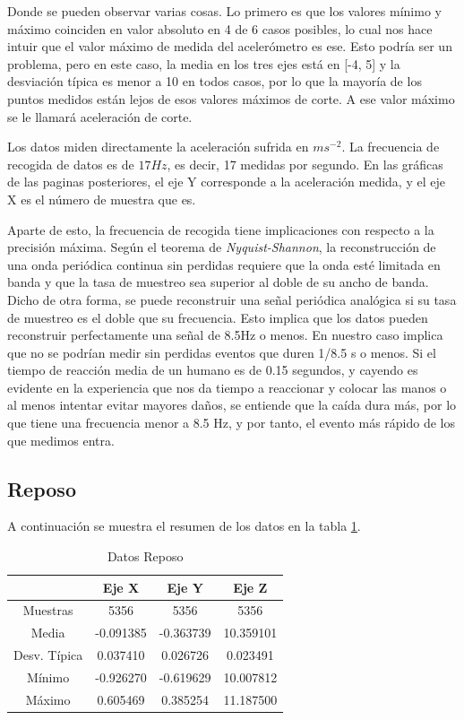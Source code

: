 \documentclass[12pt]{book}
\numberwithin{equation}{section}
\begin{document}
Donde se pueden observar varias cosas. Lo primero es que los valores mínimo y máximo coinciden en valor absoluto en 4 de 6 casos posibles, lo cual nos hace intuir que el valor máximo de medida del acelerómetro es ese. Esto podría ser un problema, pero en este caso, la media en los tres ejes está en [-4, 5] y la desviación típica es menor a 10 en todos casos, por lo que la mayoría de los puntos medidos están lejos de esos valores máximos de corte.  A ese valor máximo se le llamará aceleración de corte.

Los datos miden directamente la aceleración sufrida en $m s^{-2}$. La frecuencia de recogida de datos es de $17Hz$, es decir, 17 medidas por segundo. En las gráficas de las paginas posteriores, el eje Y corresponde a la aceleración medida, y el eje X es el número de muestra que es.

Aparte de esto, la frecuencia de recogida tiene implicaciones con respecto a la precisión máxima. Según el teorema de \textit{Nyquist-Shannon}, la reconstrucción de una onda periódica continua sin perdidas requiere que la onda esté limitada en banda y que la tasa de muestreo sea superior al doble de su ancho de banda. Dicho de otra forma, se puede reconstruir una señal periódica analógica si su tasa de muestreo es el doble que su frecuencia. Esto implica que los datos pueden reconstruir perfectamente una señal de 8.5Hz o menos. En nuestro caso implica que no se podrían medir sin perdidas eventos que duren 1/8.5 s o menos. Si el tiempo de reacción media de un humano es de 0.15 segundos, y cayendo es evidente en la experiencia que nos da tiempo a reaccionar y colocar las manos o al menos intentar evitar mayores daños, se entiende que la caída dura más, por lo que tiene una frecuencia menor a 8.5 Hz, y por tanto, el evento más rápido de los que medimos entra.

\subsection{Reposo}

A continuación se muestra el resumen de los datos en la tabla \ref{tabla3}.

\begin{table}[h]
\centering
\caption{Datos Reposo}
\begin{tabular}{| c | c | c | c |}
\hline
 & Eje X & Eje Y & Eje Z \\
\hline
Muestras & 5356 & 5356 & 5356 \\
\hline
Media & -0.091385 & -0.363739 & 10.359101 \\
\hline
Desv. Típica & 0.037410 & 0.026726 & 0.023491 \\
\hline
Mínimo & -0.926270 & -0.619629 & 10.007812 \\
\hline
Máximo & 0.605469 & 0.385254 & 11.187500 \\
\hline
\end{tabular}
\label{tabla3}
\end{table}
\end{document}
